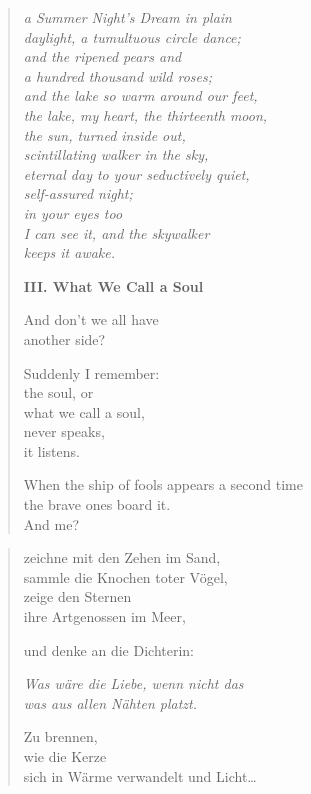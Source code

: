 \begin{verse}
{\itshape
a {\upshape Summer Night's Dream} in plain\label{summer-nights}\\
daylight, a tumultuous circle dance;\\
and the ripened pears and\\
a hundred thousand wild roses;\\
and the lake so warm around our feet,\\
the lake, my heart, the thirteenth moon,\\
the sun, turned inside out,\\
scintillating walker in the sky,\\
eternal day to your seductively quiet,\\
self-assured night;\\
in your eyes too\\
I can see it, and the skywalker\\
keeps it awake.}

\vspace*{-0.5em}
{\bfseries III. What We Call a Soul}
\vspace*{-0.5em}

And don't we all have\\
another side?

Suddenly I remember:\\
the soul, or\\
what we call a soul,\\
never speaks,\\
it listens.

When the ship of fools appears a second time\\
the brave ones board it.\\
And me?
\end{verse}

\clearpage

\begin{verse}
zeichne mit den Zehen im Sand,\\
sammle die Knochen toter Vögel,\\
zeige den Sternen\\
ihre Artgenossen im Meer,

und denke an die Dichterin:

{\itshape Was wäre die Liebe, wenn nicht das\\
was aus allen Nähten platzt.}

Zu brennen,\\
wie die Kerze\\
sich in Wärme verwandelt und Licht\ldots
\end{verse}

